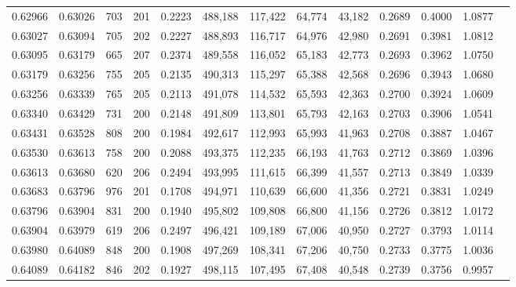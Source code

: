 \begin{tabular}{rrrrrrrrrrrrr}
0.62966 & 0.63026 &   703 & 201 &                                     0.2223 & 488,188 & 117,422 &  64,774 &  43,182 & 0.2689 & 0.4000 & 1.0877 \\
0.63027 & 0.63094 &   705 & 202 &                                     0.2227 & 488,893 & 116,717 &  64,976 &  42,980 & 0.2691 & 0.3981 & 1.0812 \\
0.63095 & 0.63179 &   665 & 207 &                                     0.2374 & 489,558 & 116,052 &  65,183 &  42,773 & 0.2693 & 0.3962 & 1.0750 \\
0.63179 & 0.63256 &   755 & 205 &                                     0.2135 & 490,313 & 115,297 &  65,388 &  42,568 & 0.2696 & 0.3943 & 1.0680 \\
0.63256 & 0.63339 &   765 & 205 &                                     0.2113 & 491,078 & 114,532 &  65,593 &  42,363 & 0.2700 & 0.3924 & 1.0609 \\
0.63340 & 0.63429 &   731 & 200 &                                     0.2148 & 491,809 & 113,801 &  65,793 &  42,163 & 0.2703 & 0.3906 & 1.0541 \\
0.63431 & 0.63528 &   808 & 200 &                                     0.1984 & 492,617 & 112,993 &  65,993 &  41,963 & 0.2708 & 0.3887 & 1.0467 \\
0.63530 & 0.63613 &   758 & 200 &                                     0.2088 & 493,375 & 112,235 &  66,193 &  41,763 & 0.2712 & 0.3869 & 1.0396 \\
0.63613 & 0.63680 &   620 & 206 &                                     0.2494 & 493,995 & 111,615 &  66,399 &  41,557 & 0.2713 & 0.3849 & 1.0339 \\
0.63683 & 0.63796 &   976 & 201 &                                     0.1708 & 494,971 & 110,639 &  66,600 &  41,356 & 0.2721 & 0.3831 & 1.0249 \\
0.63796 & 0.63904 &   831 & 200 &                                     0.1940 & 495,802 & 109,808 &  66,800 &  41,156 & 0.2726 & 0.3812 & 1.0172 \\
0.63904 & 0.63979 &   619 & 206 &                                     0.2497 & 496,421 & 109,189 &  67,006 &  40,950 & 0.2727 & 0.3793 & 1.0114 \\
0.63980 & 0.64089 &   848 & 200 &                                     0.1908 & 497,269 & 108,341 &  67,206 &  40,750 & 0.2733 & 0.3775 & 1.0036 \\
0.64089 & 0.64182 &   846 & 202 &                                     0.1927 & 498,115 & 107,495 &  67,408 &  40,548 & 0.2739 & 0.3756 & 0.9957 \\

\end{tabular}
